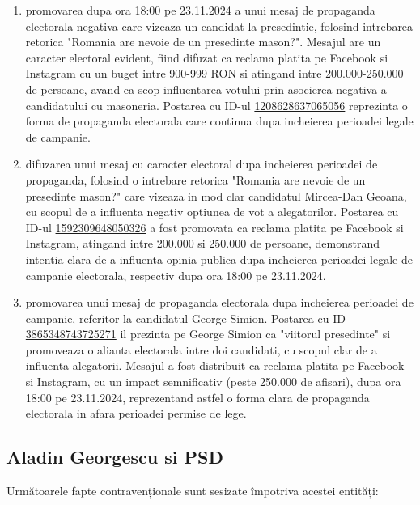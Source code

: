 \documentclass[a4paper,12pt]{article}
\begin{document}
\begin{enumerate}[leftmargin=*, label=\arabic*.)]
    \item promovarea dupa ora 18:00 pe 23.11.2024 a unui mesaj de propaganda electorala negativa care vizeaza un candidat la presedintie, folosind intrebarea retorica "Romania are nevoie de un presedinte mason?". Mesajul are un caracter electoral evident, fiind difuzat ca reclama platita pe Facebook si Instagram cu un buget intre 900-999 RON si atingand intre 200.000-250.000 de persoane, avand ca scop influentarea votului prin asocierea negativa a candidatului cu masoneria. Postarea cu ID-ul \href{https://www.facebook.com/ads/library/?id=1208628637065056}{1208628637065056} reprezinta o forma de propaganda electorala care continua dupa incheierea perioadei legale de campanie.
    \item difuzarea unui mesaj cu caracter electoral dupa incheierea perioadei de propaganda, folosind o intrebare retorica "Romania are nevoie de un presedinte mason?" care vizeaza in mod clar candidatul Mircea-Dan Geoana, cu scopul de a influenta negativ optiunea de vot a alegatorilor. Postarea cu ID-ul \href{https://www.facebook.com/ads/library/?id=1592309648050326}{1592309648050326} a fost promovata ca reclama platita pe Facebook si Instagram, atingand intre 200.000 si 250.000 de persoane, demonstrand intentia clara de a influenta opinia publica dupa incheierea perioadei legale de campanie electorala, respectiv dupa ora 18:00 pe 23.11.2024.
    \item promovarea unui mesaj de propaganda electorala dupa incheierea perioadei de campanie, referitor la candidatul George Simion. Postarea cu ID \href{https://www.facebook.com/ads/library/?id=3865348743725271}{3865348743725271} il prezinta pe George Simion ca "viitorul presedinte" si promoveaza o alianta electorala intre doi candidati, cu scopul clar de a influenta alegatorii. Mesajul a fost distribuit ca reclama platita pe Facebook si Instagram, cu un impact semnificativ (peste 250.000 de afisari), dupa ora 18:00 pe 23.11.2024, reprezentand astfel o forma clara de propaganda electorala in afara perioadei permise de lege.
\end{enumerate}

\vspace{0.5cm}

\subsection{Aladin Georgescu si PSD}
Următoarele fapte contravenționale sunt sesizate împotriva acestei entități:
\end{document}

